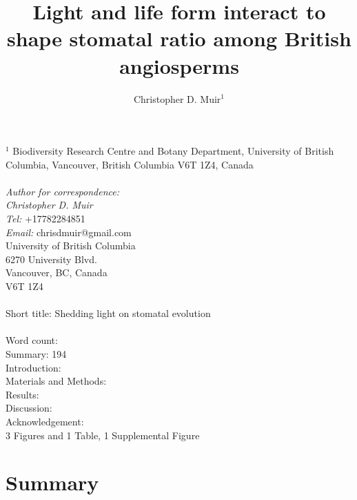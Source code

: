 \documentclass[12pt, oneside]{article}
\newcommand{\stretchy}{2}
\begin{document}


\title{Light and life form interact to shape stomatal ratio among British angiosperms}
\author{Christopher D. Muir$^1$}
\date{} %

\maketitle

$^1$ Biodiversity Research Centre and Botany Department, University of British Columbia, Vancouver, British Columbia V6T 1Z4, Canada \\
\\
\textit{Author for correspondence:} \\
\textit{Christopher D. Muir} \\
\textit{Tel:} +17782284851 \\
\textit{Email:} chrisdmuir@gmail.com \\
University of British Columbia \\
6270 University Blvd. \\
Vancouver, BC, Canada \\
V6T 1Z4 \\
\\
Short title: Shedding light on stomatal evolution\\
\\
Word count: \\
Summary:  194\\
Introduction:  \\
Materials and Methods:  \\
Results:  \\
Discussion:  \\
Acknowledgement:  \\
3 Figures and 1 Table, 1 Supplemental Figure


\linenumbers
\setstretch{\stretchy}

\section*{Summary}
\end{document}
